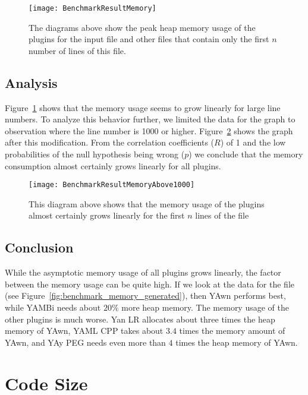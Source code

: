 \begin{figure}[H]
  \centering
    \texttt{[image: BenchmarkResultMemory]}
  \caption{The diagrams above show the peak heap memory usage of the plugins for the input file \FileGeneratedHundredThousand{} and other files that contain only the first $n$ number of lines of this file.}
  \label{fig:benchmark_results_memory_lines}
\end{figure}

\subsection{Analysis}

Figure~\ref{fig:benchmark_results_memory_lines} shows that the memory usage seems to grow linearly for large line numbers. To analyze this behavior further, we limited the data for the graph to observation where the line number is 1000 or higher. Figure~\ref{fig:benchmark_results_memory_lines_above_thousand} shows the graph after this modification. From the correlation coefficients ($R$) of 1 and the low probabilities of the null hypothesis being wrong ($p$) we conclude that the memory consumption almost certainly grows linearly for all plugins.

\begin{figure}[H]
  \centering
    \texttt{[image: BenchmarkResultMemoryAbove1000]}
  \caption{This diagram above shows that the memory usage of the  plugins almost certainly grows linearly for the first $n$ lines of the file \FileGeneratedHundredThousand{}}
  \label{fig:benchmark_results_memory_lines_above_thousand}
\end{figure}

\subsection{Conclusion}

While the asymptotic memory usage of all plugins grows linearly, the factor between the memory usage can be quite high. If we look at the data for the file \FileGenerated{} (see Figure~\ref{fig:benchmark_memory_generated}), then YAwn performs best, while YAMBi needs about $20\%$ more heap memory. The memory usage of the other plugins is much worse. Yan LR allocates about three times the heap memory of YAwn, YAML CPP takes about $3.4$ times the memory amount of YAwn, and YAy PEG needs even more than $4$ times the heap memory of YAwn.

\section{Code Size}
\label{sec:code_size}

